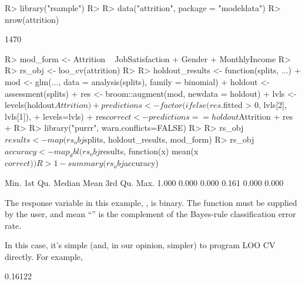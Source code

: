 \documentclass[
]{jss}
\begin{document}
\begin{CodeChunk}
\begin{CodeInput}
R> library("rsample")
R>
R> data("attrition", package = "modeldata")
R> nrow(attrition)
\end{CodeInput}
\begin{CodeOutput}
[1] 1470
\end{CodeOutput}
\begin{CodeInput}
R> mod_form <- Attrition ~ JobSatisfaction + Gender + MonthlyIncome
R>
R> rs_obj <- loo_cv(attrition)
R>
R> holdout_results <- function(splits, ...) {
+   mod <- glm(..., data = analysis(splits), family = binomial)
+   holdout <- assessment(splits)
+   res <- broom::augment(mod, newdata = holdout)
+   lvls <- levels(holdout$Attrition)
+   predictions <- factor(ifelse(res$.fitted > 0, lvls[2], lvls[1]),
+                         levels=lvls)
+   res$correct <- predictions == holdout$Attrition
+   res
+ }
R>
R> library("purrr", warn.conflicts=FALSE)
R>
R> rs_obj$results <- map(rs_obj$splits, holdout_results, mod_form)
R> rs_obj$accuracy <- map_dbl(rs_obj$results, function(x) mean(x$correct))
R> 1 - summary(rs_obj$accuracy)
\end{CodeInput}
\begin{CodeOutput}
   Min. 1st Qu.  Median    Mean 3rd Qu.    Max.
  1.000   0.000   0.000   0.161   0.000   0.000
\end{CodeOutput}
\end{CodeChunk}

The response variable in this example, , is binary. The
function  must be supplied by the user, and mean
``'' is the complement of the Bayes-rule classification
error rate.

In this case, it's simple (and, in our opinion, simpler) to program LOO
CV directly. For example,

\begin{CodeChunk}
\begin{CodeOutput}
[1] 0.16122
\end{CodeOutput}
\end{CodeChunk}
\end{document}
